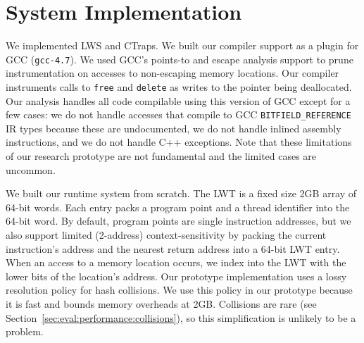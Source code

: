 \documentclass[pageno,nohyperref]{jpaper}
\newcommand{\ctraps}{CTraps\xspace}
\newcommand{\lws}{LWS\xspace}
\begin{document}

\section{System Implementation}
\label{sec:implementation}
We implemented \lws and \ctraps.  We built our compiler support
as a plugin for GCC ({\tt gcc-4.7}).  We used GCC's points-to and
escape analysis support to prune instrumentation on accesses to non-escaping memory
locations.  Our compiler instruments calls to {\tt free} and {\tt delete} as
writes to the pointer being deallocated.  Our analysis handles all code
compilable using this version of GCC except for a few cases: we do not handle
accesses that compile to GCC {\tt BITFIELD\_REFERENCE} IR types because these
are undocumented, we do not handle inlined assembly instructions, and we do not
handle C++ exceptions.  Note that these limitations of our research prototype
are not fundamental and the limited cases are uncommon.   

We built our runtime system from scratch.  The LWT is a fixed size 2GB array of
64-bit words.  Each entry packs a program point and a thread identifier into
the 64-bit word.  By default, program points are single instruction addresses,
but we also support limited (2-address) context-sensitivity by packing the
current instruction's address and the nearest return address into a 64-bit LWT
entry. When an access to a memory location occurs, we index into the LWT with
the lower bits of the location's address.  Our prototype implementation uses a
lossy resolution policy for hash collisions.  We use this policy in our
prototype because it is fast and bounds memory overheads at 2GB.  Collisions
are rare (see Section~\ref{sec:eval:performance:collisions}), so this
simplification is unlikely to be a problem.  
\end{document}

